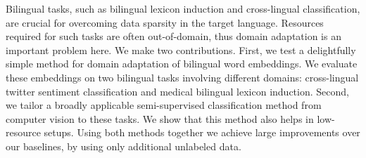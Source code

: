 Bilingual tasks, such as bilingual lexicon induction and cross-lingual classification, are crucial for overcoming data sparsity in the target language. Resources required for such tasks are often out-of-domain, thus domain adaptation is an important problem here. We make two contributions. First, we test a delightfully simple method for domain adaptation of bilingual word embeddings. We evaluate these embeddings on two bilingual tasks involving different domains: cross-lingual twitter sentiment classification and medical bilingual lexicon induction. Second, we tailor a broadly applicable semi-supervised classification method from computer vision to these tasks. We show that this method also helps in low-resource setups. Using both methods together we achieve large improvements over our baselines, by using only additional unlabeled data.
